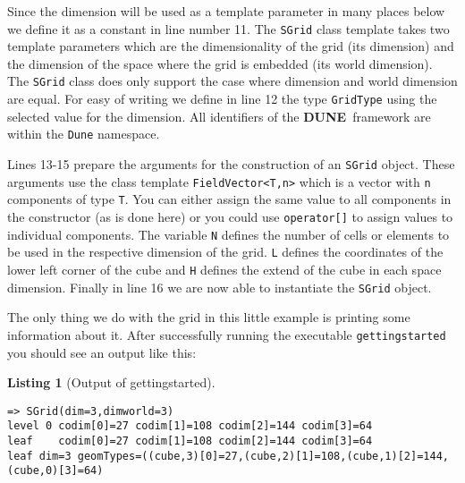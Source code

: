 \documentclass[11pt,a4paper,headinclude,footinclude,DIV14,BCOR8.25mm,titlepage,twoside,openright,normalheadings]{scrreprt}
\newcommand{\Dune}{{\sf\bfseries DUNE}}
\newtheorem{lst}{Listing}
\begin{document}
Since the dimension will be used as a template parameter in many
places below we define it as a constant in line number 11.
The \lstinline!SGrid! class template takes two template
parameters which are the dimensionality of the grid (its dimension)
and the dimension of the space where the grid is embedded (its world
dimension). The \lstinline!SGrid! class does only support the case
where dimension and world dimension are equal. For easy of writing we
define in line 12 the type \lstinline!GridType! using the selected
value for the dimension. All identifiers of the \Dune\
framework are within the \lstinline!Dune! namespace.

Lines 13-15 prepare the arguments for the construction of an
\lstinline!SGrid! object. These arguments use the class template
\lstinline!FieldVector<T,n>! which is a vector with \lstinline!n!
components of type \lstinline!T!. You can either assign the same value
to all components in the constructor (as is done here) or you could
use \lstinline!operator[]! to assign values to individual components.
The variable \lstinline!N! defines the number of cells or elements to
be used in the respective dimension of the grid. \lstinline!L! defines
the coordinates of the lower left corner of the cube and \lstinline!H!
defines the extend of the cube in each space dimension. Finally in
line 16 we are now able to instantiate the \lstinline!SGrid!
object.

The only thing we do with the grid in this little example is printing
some information about it. After successfully running the executable
\lstinline!gettingstarted! you should see an output like this:

\begin{lst}[Output of gettingstarted] \mbox{}

\begin{lstlisting}[basicstyle=\ttfamily\scriptsize]
=> SGrid(dim=3,dimworld=3)
level 0 codim[0]=27 codim[1]=108 codim[2]=144 codim[3]=64
leaf    codim[0]=27 codim[1]=108 codim[2]=144 codim[3]=64
leaf dim=3 geomTypes=((cube,3)[0]=27,(cube,2)[1]=108,(cube,1)[2]=144,(cube,0)[3]=64)
\end{lstlisting}
\end{lst}
\end{document}
